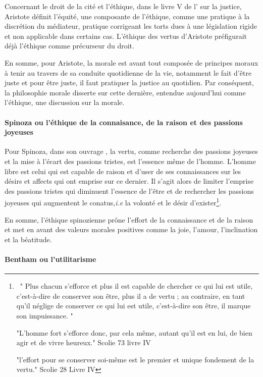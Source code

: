 Concernant le droit de la cité et l'éthique, dans le livre V de l' sur la justice, Aristote définit l'équité, une composante de l'éthique, comme une pratique à la discrétion du médiateur, pratique corrigeant les torts dues à une législation rigide et non applicable dans certains cas. L'éthique des vertus d'Aristote préfigurait déjà l'éthique comme précurseur du droit.

En somme, pour Aristote, la morale est avant tout composée de principes moraux à tenir au travers de sa conduite quotidienne de la vie, notamment le fait d'être juste et pour être juste, il faut pratiquer la justice au quotidien. Par conséquent, la philosophie morale disserte sur cette dernière, entendue aujourd'hui comme l'éthique, une discussion sur la morale.


\paragraph{Spinoza ou l'éthique de la connaisance, de la raison et des passions joyeuses}


Pour Spinoza, dans son ouvrage , la vertu, comme recherche des passions joyeuses et la mise à l'écart des passions tristes, est l'essence même de l'homme. L'homme libre est celui qui est capable de raison et d'user de ses connaissances sur les désirs et affects qui ont emprise sur ce dernier. Il s'agit alors de limiter l'emprise des passions tristes qui diminuent l'essence de l'être et de rechercher les passions joyeuses qui augmentent le conatus,\textit{i.e} la volonté et le désir d'exister\footnote{~"
Plus chacun s'efforce et plus il est capable de chercher ce qui lui est utile, c'est-à-dire de conserver son être, plus il a de vertu ; au contraire, en tant qu'il néglige de conserver ce qui lui est utile, c'est-à-dire son être, il marque son impuissance.
"

"L'homme fort s'efforce donc, par cela même, autant qu'il est en lui, de bien agir et de vivre heureux." Scolie 73 livre IV

"l'effort pour se conserver soi-même est le premier et unique fondement de la vertu." Scolie 28 Livre IV}.



En somme, l'éthique spinozienne prône l'effort de la connaissance et de la raison et met en avant des valeurs morales positives comme la joie, l'amour, l'inclination et la béatitude. 


\paragraph{Bentham ou l'utilitarisme}


